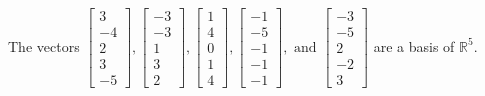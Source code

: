 \begin{exercise}
\begin{exerciseStatement}
  \end{exerciseStatement}
  \begin{exerciseAnswer}
   The vectors \(\left[\begin{array}{r}
3 \\
-4 \\
2 \\
3 \\
-5
\end{array}\right] , \left[\begin{array}{r}
-3 \\
-3 \\
1 \\
3 \\
2
\end{array}\right] , \left[\begin{array}{r}
1 \\
4 \\
0 \\
1 \\
4
\end{array}\right] , \left[\begin{array}{r}
-1 \\
-5 \\
-1 \\
-1 \\
-1
\end{array}\right] , \text{ and } \left[\begin{array}{r}
-3 \\
-5 \\
2 \\
-2 \\
3
\end{array}\right]\) 
  	 are  a basis of \(\mathbb{R}^5\).
  


  \end{exerciseAnswer}
\end{exercise}